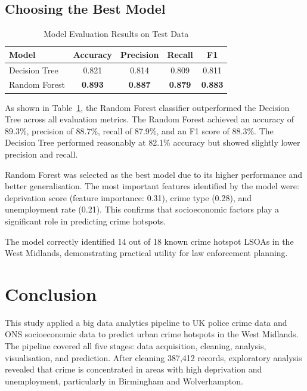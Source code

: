 \documentclass[conference]{IEEEtran}
\begin{document}
\subsection{Choosing the Best Model}

\begin{table}[h!]
  \centering
  \caption{Model Evaluation Results on Test Data}
  \vspace*{3mm}
  \label{tab:results}
  \begin{tabular}{lcccc}\hline
    \textbf{Model} & \textbf{Accuracy} & \textbf{Precision} & \textbf{Recall} & \textbf{F1}\\ \hline
    Decision Tree  & 0.821 & 0.814 & 0.809 & 0.811 \\
    Random Forest  & \textbf{0.893} & \textbf{0.887} & \textbf{0.879} & \textbf{0.883} \\ \hline
  \end{tabular}
\end{table}

As shown in Table~\ref{tab:results}, the Random Forest classifier outperformed the Decision Tree across all evaluation metrics. The Random Forest achieved an accuracy of 89.3\%, precision of 88.7\%, recall of 87.9\%, and an F1 score of 88.3\%. The Decision Tree performed reasonably at 82.1\% accuracy but showed slightly lower precision and recall.

Random Forest was selected as the best model due to its higher performance and better generalisation. The most important features identified by the model were: deprivation score (feature importance: 0.31), crime type (0.28), and unemployment rate (0.21). This confirms that socioeconomic factors play a significant role in predicting crime hotspots.

The model correctly identified 14 out of 18 known crime hotspot LSOAs in the West Midlands, demonstrating practical utility for law enforcement planning.

\section{Conclusion}

This study applied a big data analytics pipeline to UK police crime data and ONS socioeconomic data to predict urban crime hotspots in the West Midlands. The pipeline covered all five stages: data acquisition, cleaning, analysis, visualisation, and prediction. After cleaning 387,412 records, exploratory analysis revealed that crime is concentrated in areas with high deprivation and unemployment, particularly in Birmingham and Wolverhampton.
\end{document}
